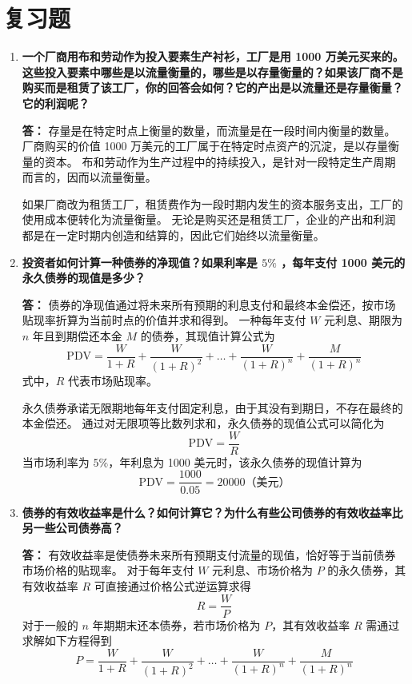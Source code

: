 	\section{复习题}
	\begin{enumerate}[label=\textbf{\arabic*.}, leftmargin=*]
		\item \textbf{一个厂商用布和劳动作为投入要素生产衬衫，工厂是用 1000 万美元买来的。这些投入要素中哪些是以流量衡量的，哪些是以存量衡量的？如果该厂商不是购买而是租赁了该工厂，你的回答会如何？它的产出是以流量还是存量衡量？它的利润呢？}
		
		\textbf{答：}
		存量是在特定时点上衡量的数量，而流量是在一段时间内衡量的数量。
		厂商购买的价值 1000 万美元的工厂属于在特定时点资产的沉淀，是以存量衡量的资本。
		布和劳动作为生产过程中的持续投入，是针对一段特定生产周期而言的，因而以流量衡量。
		
		如果厂商改为租赁工厂，租赁费作为一段时期内发生的资本服务支出，工厂的使用成本便转化为流量衡量。
		无论是购买还是租赁工厂，企业的产出和利润都是在一定时期内创造和结算的，因此它们始终以流量衡量。
		
		\item \textbf{投资者如何计算一种债券的净现值？如果利率是 $5\%$ ，每年支付 1000 美元的永久债券的现值是多少？}
		
		\textbf{答：}
		债券的净现值通过将未来所有预期的利息支付和最终本金偿还，按市场贴现率折算为当前时点的价值并求和得到。
		一种每年支付 $W$ 元利息、期限为 $n$ 年且到期偿还本金 $M$ 的债券，其现值计算公式为
		\[
		\text{PDV} = \frac{W}{1+R} + \frac{W}{(1+R)^2} + \dots + \frac{W}{(1+R)^n} + \frac{M}{(1+R)^n}
		\]
		式中，$R$ 代表市场贴现率。
		
		永久债券承诺无限期地每年支付固定利息，由于其没有到期日，不存在最终的本金偿还。
		通过对无限项等比数列求和，永久债券的现值公式可以简化为
		\[
		\text{PDV} = \frac{W}{R}
		\]
		当市场利率为 $5\%$，年利息为 1000 美元时，该永久债券的现值计算为
		\[
		\text{PDV} = \frac{1000}{0.05} = 20000 \text{（美元）}
		\]
		
		\item \textbf{债券的有效收益率是什么？如何计算它？为什么有些公司债券的有效收益率比另一些公司债券高？}
		
		\textbf{答：}
		有效收益率是使债券未来所有预期支付流量的现值，恰好等于当前债券市场价格的贴现率。
		对于每年支付 $W$ 元利息、市场价格为 $P$ 的永久债券，其有效收益率 $R$ 可直接通过价格公式逆运算求得
		\[
		R = \frac{W}{P}
		\]
		对于一般的 $n$ 年期期末还本债券，若市场价格为 $P$，其有效收益率 $R$ 需通过求解如下方程得到
		\[
		P = \frac{W}{1+R} + \frac{W}{(1+R)^2} + \dots + \frac{W}{(1+R)^n} + \frac{M}{(1+R)^n}
		\]
		

\end{enumerate}
